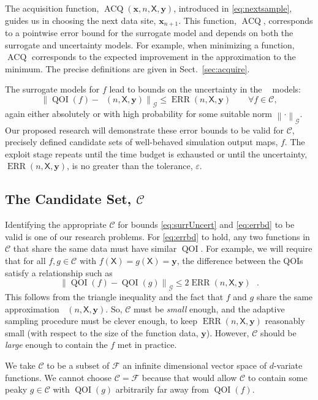\documentclass[11pt]{NSFamsart}
\DeclareMathOperator{\QOI}{QOI} %
\DeclareMathOperator{\APP}{\widehat{\QOI}}
\DeclareMathOperator{\ERR}{ERR}
\DeclareMathOperator{\VAL}{ACQ}
\newcommand{\mX}{\mathsf{X}}
\newcommand{\bx}{{\boldsymbol{x}}}
\newcommand{\by}{{\boldsymbol{y}}}
\newcommand{\calc}{{\mathcal{C}}}
\newcommand{\calf}{{\mathcal{F}}}
\newcommand{\calg}{{\mathcal{G}}}
\newcommand{\norm}[2][{}]{\ensuremath{\left \lVert #2 \right \rVert}_{#1}}
\newcommand{\bignorm}[2][{}]{\ensuremath{\bigl \lVert #2 \bigr \rVert}_{#1}}
\begin{document}
The acquisition function, $\VAL(\bx,n,\mX, \by)$, introduced in \eqref{eq:nextsample}, guides us in choosing the next data site, $\bx_{n+1}$.  
This function, $\VAL$, corresponds to a pointwise error bound for the surrogate model and depends on both the surrogate and  uncertainty models.  For example, when minimizing a function, $\VAL$ corresponds to the expected improvement in the approximation to the minimum. The precise definitions are given in Sect.\ \ref{sec:acquire}.

The surrogate models for $f$ lead to bounds on the uncertainty in the $\APP$ models:
\begin{equation} \label{eq:errbd}
\bignorm[\calg]{\QOI(f) - \APP(n,\mX,\by)} \le \ERR(n,\mX,\by) \qquad \forall f \in \calc,
\end{equation}
again either absolutely or with high probability for some suitable norm $\norm[\calg]{\cdot}$. 
Our proposed research will demonstrate these error bounds to be valid for $\calc$, precisely defined candidate sets of well-behaved simulation output maps, $f$. 
The exploit stage repeats until the time budget is exhausted or until  the uncertainty, $\ERR(n,\mX,\by)$, is no greater than the tolerance, $\varepsilon$.

\subsection{The Candidate Set, $\calc$} 
Identifying the appropriate $\calc$ for bounds  \eqref{eq:surrUncert} and \eqref{eq:errbd} to be valid is one of our research problems.
For \eqref{eq:errbd}  to hold, any two functions in $\calc$ that share the same data must have similar $\QOI$.  For example, we will require that for all $f, g \in \calc \text{ with } f(\mX) = g(\mX) = \by$, the difference between the QOIs satisfy a relationship such as 
\begin{equation} \label{eq:Csmall}
	\bignorm[\calg]{\QOI(f) - \QOI(g)} \le 2 \ERR(n,\mX,\by) ~~~ .
\end{equation}
This follows from the triangle inequality and the fact that $f$ and $g$ share the same approximation $\APP(n,\mX,\by)$. So, $\calc$ must be \emph{small} enough, and the adaptive sampling procedure must be clever enough, to keep $\ERR(n,\mX,\by)$ reasonably small (with respect to the size of the function data, $\by$).  However, $\calc$ should be \emph{large} enough to contain the $f$ met in practice.

We take $\calc$ to be a subset of $\calf$ an infinite dimensional vector space of $d$-variate functions. We cannot choose $\calc = \calf$ because that would allow $\calc$ to contain some peaky $g \in \calc$ with $\QOI(g)$ arbitrarily far away from $\QOI(f)$. 
\end{document}
